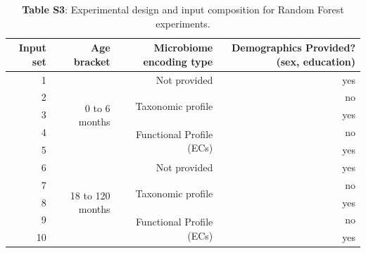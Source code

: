 \documentclass{article}
\begin{document}
\begin{table}[h]
  \begin{centering}
    \begin{tabular}{|r|r|r|r|}
      \hline\hline
      \textbf{Input set} & \textbf{Age bracket} & \textbf{Microbiome encoding type} & \textbf{Demographics Provided? (sex, education)} \\\hline
      1 & \multirow{5}{*}{0 to 6 months} & Not provided & yes \\ \cline{3-4}
      2 &  & \multirow{2}{*}{Taxonomic profile} & no \\ \cline{4-4}
      3 &  &  & yes \\ \cline{3-4}
      4 &  & \multirow{2}{*}{Functional Profile (ECs)} & no \\ \cline{4-4}
      5 &  &  & yes \\ \cline{2-4}
      6 & \multirow{5}{*}{18 to 120 months} & Not provided & yes \\ \cline{3-4}
      7 &  & \multirow{2}{*}{Taxonomic profile} & no \\ \cline{4-4}
      8 &  &  & yes \\ \cline{3-4}
      9 &  & \multirow{2}{*}{Functional Profile (ECs)} & no \\ \cline{4-4}
      10 &  &  & yes \\\hline\hline
    \end{tabular}
    \caption*{
      \textbf{Table S3}: Experimental design and input composition for Random
      Forest experiments.
    }
  \end{centering}
\end{table}
\end{document}
